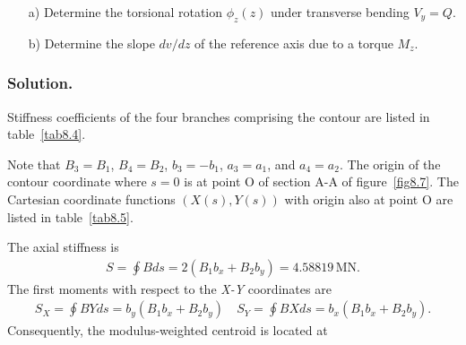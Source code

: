\documentclass{AeroStructure-ERJohnson}
\begin{document}
\begin{example*}
\begin{enumerate}[b)]%
\item[{\hskip13pt}a)] Determine the torsional rotation $\phi_{z}(z)$ under
transverse bending $V_{y}=Q$.

\item[{\hskip13pt}b)] Determine the slope $d v/ d z$ of the reference axis due
to a torque $M_z$.
\end{enumerate}


\subsubsection{Solution.} Stiffness coefficients of the four
branches comprising the contour are listed in table~\ref{tab8.4}.



Note that $B_{3}=B_{1}$, $B_{4}=B_{2}$, $b_{3}=-b_{1}$,
$a_{3}=a_{1}$, and $a_{4}=a_{2}$. The origin of the contour
coordinate where $s=0$ is at point O of section A-A of
figure~\ref{fig8.7}. The Cartesian coordinate functions $(X(s),
Y(s))$ with origin also at point O are listed in
table~\ref{tab8.5}.

The axial stiffness is
\begin{align}\label{ex8.4a}
S=\oint B d s=2\left(B_{1} b_{x}+B_{2} b_{y}\right)=4.58819\,\mathrm{MN}.\tag{a}
\end{align}
The first moments with respect to the \textit{X-Y} coordinates are
\begin{align}\label{ex8.4b}
S_{X}=\oint B Y d s=b_{y}\left(B_{1} b_{x}+B_{2} b_{y}\right)
\quad S_{Y}=\oint B X d s=b_{x}\left(B_{1} b_{x}+B_{2}
b_{y}\right).\tag{b}
\end{align}
Consequently, the modulus-weighted centroid is located at

\vspace*{8pt}
\clearpage


\end{example*}
\end{document}

